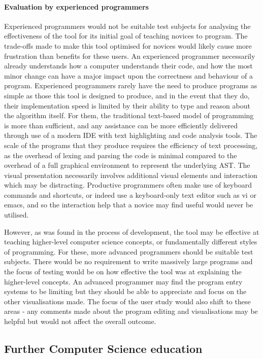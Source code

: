\paragraph{Evaluation by experienced programmers}
Experienced programmers would not be suitable test subjects for analysing the effectiveness of the tool for its initial goal of teaching novices to program. The trade-offs made to make this tool optimised for novices would likely cause more frustration than benefits for these users. An experienced programmer necessarily already understands how a computer understands their code, and how the most minor change can have a major impact upon the correctness and behaviour of a program. Experienced programmers rarely have the need to produce programs as simple as those this tool is designed to produce, and in the event that they do, their implementation speed is limited by their ability to type and reason about the algorithm itself. For them, the traditional text-based model of programming is more than sufficient, and any assistance can be more efficiently delivered through use of a modern IDE with text highlighting and code analysis tools. The scale of the programs that they produce requires the efficiency of text processing, as the overhead of lexing and parsing the code is minimal compared to the overhead of a full graphical environment to represent the underlying AST. The visual presentation necessarily involves additional visual elements and interaction which may be distracting. Productive programmers often make use of keyboard commands and shortcuts, or indeed use a keyboard-only text editor such as vi or emacs, and so the interaction help that a novice may find useful would never be utilised.

However, as was found in the process of development, the tool may be effective at teaching higher-level computer science concepts, or fundamentally different styles of programming. For these, more advanced programmers should be suitable test subjects. There would be no requirement to write massively large programs and the focus of testing would be on how effective the tool was at explaining the higher-level concepts. An advanced programmer may find the program entry systems to be limiting but they should be able to appreciate and focus on the other visualisations made. The focus of the user study would also shift to these areas - any comments made about the program editing and visualisations may be helpful but would not affect the overall outcome.

\subsection{Further Computer Science education}

